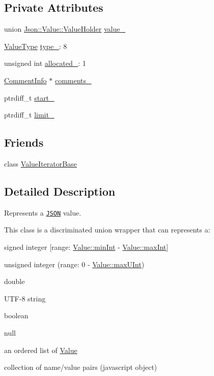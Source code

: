 \subsection*{Private Attributes}
\begin{DoxyCompactItemize}
\item 
union \hyperlink{unionJson_1_1Value_1_1ValueHolder}{Json\+::\+Value\+::\+Value\+Holder} \hyperlink{classJson_1_1Value_aef578244546212705b9f81eb84d7e151}{value\+\_\+}
\item 
\hyperlink{namespaceJson_a7d654b75c16a57007925868e38212b4e}{Value\+Type} \hyperlink{classJson_1_1Value_abd222c2536dc88bf330dedcd076d2356}{type\+\_\+}\+: 8
\item 
unsigned int \hyperlink{classJson_1_1Value_ae0126c80dc4907aad94088553fc7632b}{allocated\+\_\+}\+: 1
\item 
\hyperlink{structJson_1_1Value_1_1CommentInfo}{Comment\+Info} $\ast$ \hyperlink{classJson_1_1Value_a2016564cabc7a29208e97bd0b782a4e4}{comments\+\_\+}
\item 
ptrdiff\+\_\+t \hyperlink{classJson_1_1Value_a1c3aeb0fa8fefe93776cb347c76a25a8}{start\+\_\+}
\item 
ptrdiff\+\_\+t \hyperlink{classJson_1_1Value_afe377e25f6d3b5b8ea7221c84f29412a}{limit\+\_\+}
\end{DoxyCompactItemize}
\subsection*{Friends}
\begin{DoxyCompactItemize}
\item 
class \hyperlink{classJson_1_1Value_ad016df56489e5d360735457afba2f649}{Value\+Iterator\+Base}
\end{DoxyCompactItemize}


\subsection{Detailed Description}
Represents a \href{http://www.json.org}{\tt J\+S\+ON} value. 

This class is a discriminated union wrapper that can represents a\+:
\begin{DoxyItemize}
\item signed integer \mbox{[}range\+: \hyperlink{classJson_1_1Value_a7df8a39e2502b8c92a6a41e3d752d2c8}{Value\+::min\+Int} -\/ \hyperlink{classJson_1_1Value_a978c799a8af3114ef7dab6fd0a310a1b}{Value\+::max\+Int}\mbox{]}
\item unsigned integer (range\+: 0 -\/ \hyperlink{classJson_1_1Value_ac79e63ee68d3aa914bfd6988be669b87}{Value\+::max\+U\+Int})
\item double
\item U\+T\+F-\/8 string
\item boolean
\item \textquotesingle{}null\textquotesingle{}
\item an ordered list of \hyperlink{classJson_1_1Value}{Value}
\item collection of name/value pairs (javascript object)
\end{DoxyItemize}

